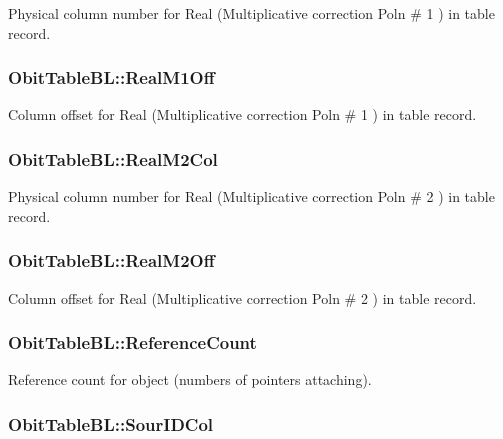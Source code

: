 Physical column number for Real (Multiplicative correction Poln \# 1 ) in table record. 

\subsubsection{ {\bf Obit\-Table\-BL::Real\-M1Off}}\label{structObitTableBL_o30}


Column offset for Real (Multiplicative correction Poln \# 1 ) in table record. 

\subsubsection{ {\bf Obit\-Table\-BL::Real\-M2Col}}\label{structObitTableBL_o39}


Physical column number for Real (Multiplicative correction Poln \# 2 ) in table record. 

\subsubsection{ {\bf Obit\-Table\-BL::Real\-M2Off}}\label{structObitTableBL_o38}


Column offset for Real (Multiplicative correction Poln \# 2 ) in table record. 

\subsubsection{ {\bf Obit\-Table\-BL::Reference\-Count}}\label{structObitTableBL_o2}


Reference count for object (numbers of pointers attaching). 

\subsubsection{ {\bf Obit\-Table\-BL::Sour\-IDCol}}\label{structObitTableBL_o21}


